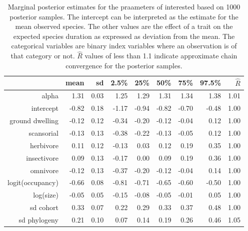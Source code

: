 \begin{table}[c]
  \centering
  \caption{Marginal posterior estimates for the praameters of interested based on 1000 posterior samples. The intercept can be interpreted as the estimate for the mean observed species. The other values are the effect of a trait on the expected species duration as expressed as deviation from the mean. The categorical variables are binary index variables where an observation is of that category or not. \(\hat{R}\) values of less than 1.1 indicate approximate chain convergence for the posterior samples.}
  \begin{tabular}{rrrrrrrrr}
    \hline
    & mean & sd & 2.5\% & 25\% & 50\% & 75\% & 97.5\% & \(\hat{R}\) \\ 
    \hline
    \hline
    alpha & 1.31 & 0.03 & 1.25 & 1.29 & 1.31 & 1.34 & 1.38 & 1.01 \\ 
    \hline
    intercept & -0.82 & 0.18 & -1.17 & -0.94 & -0.82 & -0.70 & -0.48 & 1.00 \\ 
    ground dwelling & -0.12 & 0.12 & -0.34 & -0.20 & -0.12 & -0.04 & 0.12 & 1.00 \\ 
    scansorial & -0.13 & 0.13 & -0.38 & -0.22 & -0.13 & -0.05 & 0.12 & 1.00 \\ 
    herbivore & 0.11 & 0.12 & -0.13 & 0.03 & 0.12 & 0.19 & 0.35 & 1.00 \\ 
    insectivore & 0.09 & 0.13 & -0.17 & 0.00 & 0.09 & 0.19 & 0.36 & 1.00 \\ 
    omnivore & -0.12 & 0.13 & -0.37 & -0.20 & -0.12 & -0.04 & 0.14 & 1.00 \\ 
    logit(occupancy) & -0.66 & 0.08 & -0.81 & -0.71 & -0.65 & -0.60 & -0.50 & 1.00 \\ 
    log(size) & -0.05 & 0.05 & -0.15 & -0.08 & -0.05 & -0.01 & 0.05 & 1.00 \\ 
    \hline
    sd cohort & 0.33 & 0.07 & 0.22 & 0.29 & 0.33 & 0.37 & 0.48 & 1.00 \\ 
    sd phylogeny & 0.21 & 0.10 & 0.07 & 0.14 & 0.19 & 0.26 & 0.46 & 1.05 \\ 
    \hline
  \end{tabular}
  \label{tab:post_sum}
\end{table}
